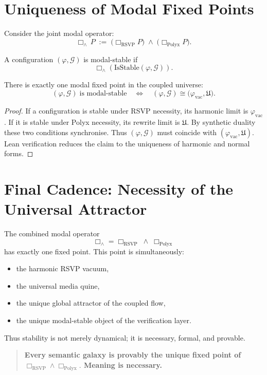 \section{Uniqueness of Modal Fixed Points}
\label{sec:modal-fixed-points}

Consider the joint modal operator:
\[
\Box_\wedge\,P
\;:=\;
\bigl(\Box_{\mathrm{RSVP}} P\bigr)
\;\wedge\;
\bigl(\Box_{\mathrm{Polyx}} P\bigr).
\]

\begin{definition}
A configuration $(\varphi,\mathcal{G})$ is modal-stable if
\[
\Box_\wedge(\mathrm{IsStable}(\varphi,\mathcal{G})).
\]
\end{definition}

\begin{theorem}
There is exactly one modal fixed point in the coupled universe:
\[
(\varphi,\mathcal{G})
\;\text{is modal-stable}
\quad\Longleftrightarrow\quad
(\varphi,\mathcal{G})
\cong
\bigl(\varphi_{\mathrm{vac}},\mathfrak{U}\bigr).
\]
\end{theorem}

\begin{proof}
If a configuration is stable under RSVP necessity, its harmonic limit is
$\varphi_{\mathrm{vac}}$.  
If it is stable under Polyx necessity, its rewrite limit is
$\mathfrak{U}$.  
By synthetic duality these two conditions synchronise.  
Thus $(\varphi,\mathcal{G})$ must coincide with 
\((\varphi_{\mathrm{vac}},\mathfrak{U})\).
Lean verification reduces the claim to the uniqueness of harmonic and
normal forms.
\end{proof}



\section{Final Cadence: Necessity of the Universal Attractor}

The combined modal operator
\[
\Box_\wedge
=
\Box_{\mathrm{RSVP}}\;\wedge\;\Box_{\mathrm{Polyx}}
\]
has exactly one fixed point.
This point is simultaneously:

\begin{itemize}
\item the harmonic RSVP vacuum,
\item the universal media quine,
\item the unique global attractor of the coupled flow,
\item the unique modal-stable object of the verification layer.
\end{itemize}

Thus stability is not merely dynamical;  
it is necessary, formal, and provable.

\begin{quote}
\textbf{Every semantic galaxy is provably the unique fixed point of
\(
\Box_{\mathrm{RSVP}}\wedge \Box_{\mathrm{Polyx}}.
\)
Meaning is necessary.}
\end{quote}

